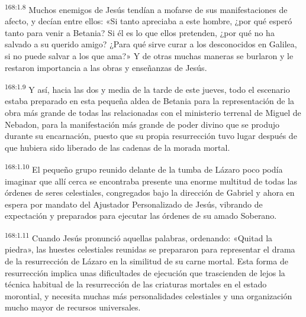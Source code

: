 \par 
\textsuperscript{168:1.8} Muchos enemigos de Jesús tendían a mofarse de sus manifestaciones de afecto, y decían entre ellos: «Si tanto apreciaba a este hombre, ¿por qué esperó tanto para venir a Betania? Si él es lo que ellos pretenden, ¿por qué no ha salvado a su querido amigo? ¿Para qué sirve curar a los desconocidos en Galilea, si no puede salvar a los que ama?» Y de otras muchas maneras se burlaron y le restaron importancia a las obras y enseñanzas de Jesús.

\par 
\textsuperscript{168:1.9} Y así, hacia las dos y media de la tarde de este jueves, todo el escenario estaba preparado en esta pequeña aldea de Betania para la representación de la obra más grande de todas las relacionadas con el ministerio terrenal de Miguel de Nebadon, para la manifestación más grande de poder divino que se produjo durante su encarnación, puesto que su propia resurrección tuvo lugar después de que hubiera sido liberado de las cadenas de la morada mortal.

\par 
\textsuperscript{168:1.10} El pequeño grupo reunido delante de la tumba de Lázaro poco podía imaginar que allí cerca se encontraba presente una enorme multitud de todas las órdenes de seres celestiales, congregados bajo la dirección de Gabriel y ahora en espera por mandato del Ajustador Personalizado de Jesús, vibrando de expectación y preparados para ejecutar las órdenes de su amado Soberano.

\par 
\textsuperscript{168:1.11} Cuando Jesús pronunció aquellas palabras, ordenando: «Quitad la piedra», las huestes celestiales reunidas se prepararon para representar el drama de la resurrección de Lázaro en la similitud de su carne mortal. Esta forma de resurrección implica unas dificultades de ejecución que trascienden de lejos la técnica habitual de la resurrección de las criaturas mortales en el estado morontial, y necesita muchas más personalidades celestiales y una organización mucho mayor de recursos universales.

